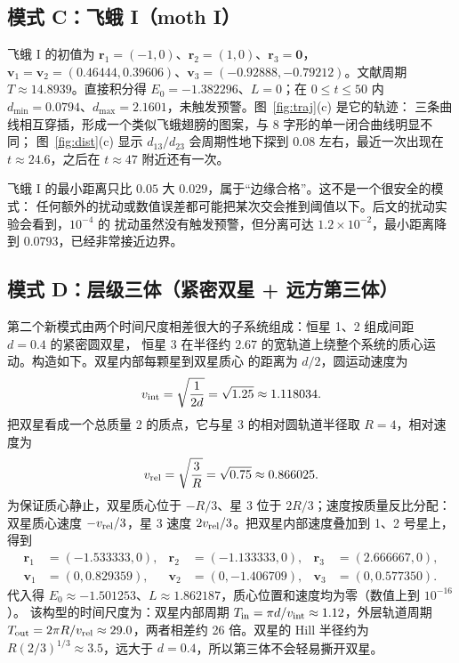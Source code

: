 \documentclass[UTF8,fontset=windows,11pt,a4paper]{ctexart}
\newcommand{\vect}[1]{\mathbf{#1}}
\begin{document}
\subsection{模式 C：飞蛾 I（moth I）}
飞蛾 I 的初值为 $\vect r_1=(-1,0)$、$\vect r_2=(1,0)$、$\vect r_3=\vect0$，
$\vect v_1=\vect v_2=(0.46444,0.39606)$、$\vect v_3=(-0.92888,-0.79212)$。文献周期
$T\approx14.8939$。直接积分得 $E_0=-1.382296$、$L=0$；在 $0\le t\le50$ 内
$d_{\min}=0.0794$、$d_{\max}=2.1601$，未触发预警。图~\ref{fig:traj}(c) 是它的轨迹：
三条曲线相互穿插，形成一个类似飞蛾翅膀的图案，与 8 字形的单一闭合曲线明显不同；
图~\ref{fig:dist}(c) 显示 $d_{13}/d_{23}$ 会周期性地下探到 $0.08$ 左右，最近一次出现在
$t\approx24.6$，之后在 $t\approx47$ 附近还有一次。

飞蛾 I 的最小距离只比 $0.05$ 大 $0.029$，属于“边缘合格”。这不是一个很安全的模式：
任何额外的扰动或数值误差都可能把某次交会推到阈值以下。后文的扰动实验会看到，$10^{-4}$ 的
扰动虽然没有触发预警，但分离可达 $1.2\times10^{-2}$，最小距离降到 $0.0793$，已经非常接近边界。

\subsection{模式 D：层级三体（紧密双星 + 远方第三体）}
第二个新模式由两个时间尺度相差很大的子系统组成：恒星 1、2 组成间距 $d=0.4$ 的紧密圆双星，
恒星 3 在半径约 $2.67$ 的宽轨道上绕整个系统的质心运动。构造如下。双星内部每颗星到双星质心
的距离为 $d/2$，圆运动速度为
\begin{equation}\label{eq:vint}
v_{\rm int}=\sqrt{\frac{1}{2d}}=\sqrt{1.25}\approx1.118034.
\end{equation}
把双星看成一个总质量 2 的质点，它与星 3 的相对圆轨道半径取 $R=4$，相对速度为
\begin{equation}\label{eq:vrel}
v_{\rm rel}=\sqrt{\frac{3}{R}}=\sqrt{0.75}\approx0.866025.
\end{equation}
为保证质心静止，双星质心位于 $-R/3$、星 3 位于 $2R/3$；速度按质量反比分配：双星质心速度
$-v_{\rm rel}/3$，星 3 速度 $2v_{\rm rel}/3$。把双星内部速度叠加到 1、2 号星上，得到
\begin{align}
\vect r_1&=(-1.533333,0),&
\vect r_2&=(-1.133333,0),&
\vect r_3&=(2.666667,0),\label{eq:icD-r}\\
\vect v_1&=(0,0.829359),&
\vect v_2&=(0,-1.406709),&
\vect v_3&=(0,0.577350).\label{eq:icD-v}
\end{align}
代入得 $E_0\approx-1.501253$、$L\approx1.862187$，质心位置和速度均为零（数值上到 $10^{-16}$）。
该构型的时间尺度为：双星内部周期 $T_{\rm in}=\pi d/v_{\rm int}\approx1.12$，外层轨道周期
$T_{\rm out}=2\pi R/v_{\rm rel}\approx29.0$，两者相差约 26 倍。双星的 Hill 半径约为
$R(2/3)^{1/3}\approx3.5$，远大于 $d=0.4$，所以第三体不会轻易撕开双星。
\end{document}
